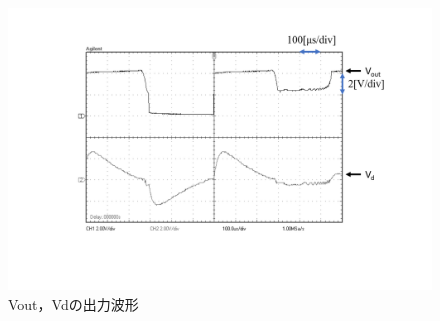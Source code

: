 \documentclass[10pt, a4j, dvipdfmx]{jarticle}
\makeatletter
\newcommand{\figcaption}[1]{\def\@captype{figure}\caption{#1}}
\makeatother
\begin{document}
\begin{figure}[H]
	\centering
	\includegraphics[width=\hsize]{images/224j-Vout-Vd.png}
	\figcaption{Vout，Vdの出力波形}
	\label{224j-Vout-Vd}
\end{figure}

\newpage
\end{document}
